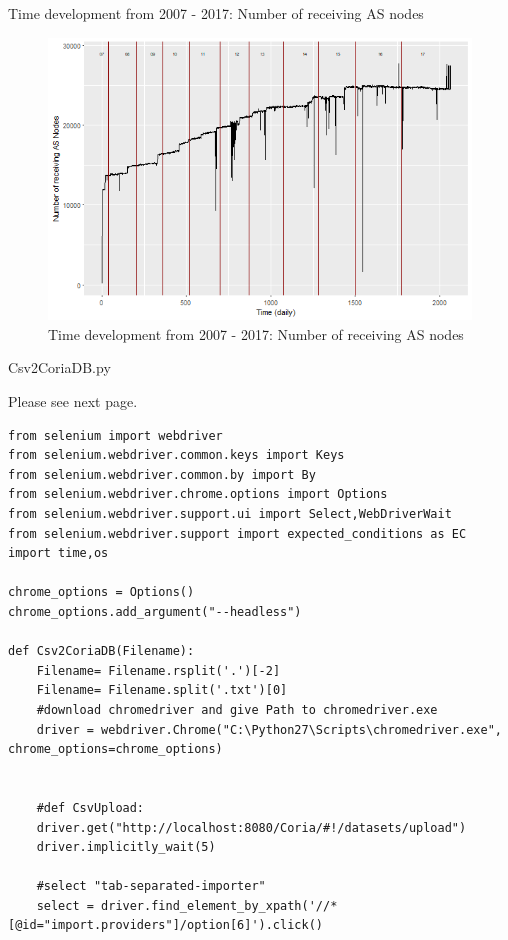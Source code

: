 \documentclass[conference, 11pt]{IEEEtran}
\begin{document}
\begin{appendices}
\begin{section}{Time development from 2007 - 2017: Number of receiving AS nodes}
\begin{figure}[htbp]
\centerline{\includegraphics[scale=0.4]{Graphics/ASToAll.png}}
\caption{Time development from 2007 - 2017: Number of receiving AS nodes}
\label{fig}
\end{figure}
\end{section}

\begin{section}{Csv2CoriaDB.py}

Please see next page. \\

\begin{lstlisting}[float=*]	
from selenium import webdriver
from selenium.webdriver.common.keys import Keys
from selenium.webdriver.common.by import By
from selenium.webdriver.chrome.options import Options
from selenium.webdriver.support.ui import Select,WebDriverWait
from selenium.webdriver.support import expected_conditions as EC
import time,os

chrome_options = Options()  
chrome_options.add_argument("--headless")  

def Csv2CoriaDB(Filename):
	Filename= Filename.rsplit('.')[-2]
	Filename= Filename.split('.txt')[0]
	#download chromedriver and give Path to chromedriver.exe
	driver = webdriver.Chrome("C:\Python27\Scripts\chromedriver.exe", chrome_options=chrome_options)


	#def CsvUpload:
	driver.get("http://localhost:8080/Coria/#!/datasets/upload")
	driver.implicitly_wait(5)

	#select "tab-separated-importer"
	select = driver.find_element_by_xpath('//*[@id="import.providers"]/option[6]').click()


\end{lstlisting}
\end{section}
\end{appendices}
\end{document}
